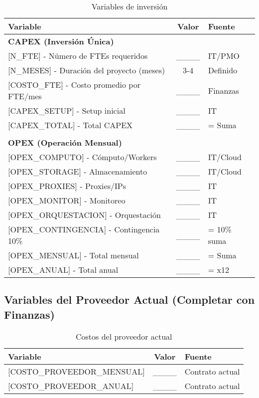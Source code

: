 \documentclass[12pt,a4paper]{article}
\begin{document}
\begin{table}[h]
\centering
\begin{tabularx}{\textwidth}{|X|c|X|}
\hline
\rowcolor{lightgray}
\textbf{Variable} & \textbf{Valor} & \textbf{Fuente} \\
\hline
\multicolumn{3}{|l|}{\textbf{CAPEX (Inversión Única)}} \\
\hline
{[}N\_FTE{]} - Número de FTEs requeridos & \_\_\_\_ & IT/PMO \\
\hline
{[}N\_MESES{]} - Duración del proyecto (meses) & 3-4 & Definido \\
\hline
{[}COSTO\_FTE{]} - Costo promedio por FTE/mes & \_\_\_\_ & Finanzas \\
\hline
{[}CAPEX\_SETUP{]} - Setup inicial & \_\_\_\_ & IT \\
\hline
{[}CAPEX\_TOTAL{]} - Total CAPEX & \_\_\_\_ & = Suma \\
\hline
\multicolumn{3}{|c|}{} \\
\hline
\multicolumn{3}{|l|}{\textbf{OPEX (Operación Mensual)}} \\
\hline
{[}OPEX\_COMPUTO{]} - Cómputo/Workers & \_\_\_\_ & IT/Cloud \\
\hline
{[}OPEX\_STORAGE{]} - Almacenamiento & \_\_\_\_ & IT/Cloud \\
\hline
{[}OPEX\_PROXIES{]} - Proxies/IPs & \_\_\_\_ & IT \\
\hline
{[}OPEX\_MONITOR{]} - Monitoreo & \_\_\_\_ & IT \\
\hline
{[}OPEX\_ORQUESTACION{]} - Orquestación & \_\_\_\_ & IT \\
\hline
{[}OPEX\_CONTINGENCIA{]} - Contingencia 10\% & \_\_\_\_ & = 10\% suma \\
\hline
{[}OPEX\_MENSUAL{]} - Total mensual & \_\_\_\_ & = Suma \\
\hline
{[}OPEX\_ANUAL{]} - Total anual & \_\_\_\_ & = x12 \\
\hline
\end{tabularx}
\caption{Variables de inversión}
\end{table}

\subsection{Variables del Proveedor Actual (Completar con Finanzas)}

\begin{table}[h]
\centering
\begin{tabularx}{\textwidth}{|X|c|X|}
\hline
\rowcolor{lightgray}
\textbf{Variable} & \textbf{Valor} & \textbf{Fuente} \\
\hline
{[}COSTO\_PROVEEDOR\_MENSUAL{]} & \_\_\_\_ & Contrato actual \\
\hline
{[}COSTO\_PROVEEDOR\_ANUAL{]} & \_\_\_\_ & Contrato actual \\
\hline
\end{tabularx}
\caption{Costos del proveedor actual}
\end{table}
\end{document}
